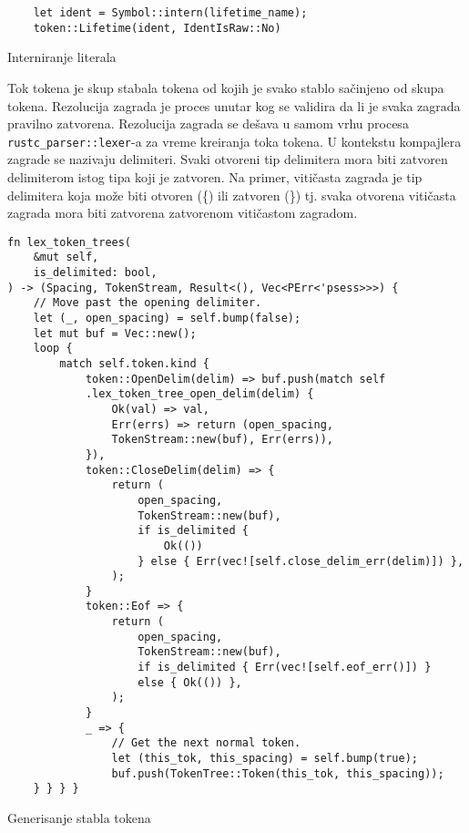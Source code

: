 \begin{listing}[H]
\begin{verbatim}
    let ident = Symbol::intern(lifetime_name);
    token::Lifetime(ident, IdentIsRaw::No)
\end{verbatim}
\caption{Interniranje literala}
\label{lst:intern}
\end{listing}
Tok tokena je skup stabala tokena od kojih je svako stablo sačinjeno od skupa tokena.  
Rezolucija zagrada je proces unutar kog se validira da li je svaka zagrada pravilno zatvorena.
Rezolucija zagrada se dešava u samom vrhu procesa \verb|rustc_parser::lexer|-a 
za vreme kreiranja toka tokena. U kontekstu kompajlera zagrade se nazivaju delimiteri. 
Svaki otvoreni tip delimitera mora biti zatvoren delimiterom istog tipa koji je zatvoren.
Na primer, vitičasta zagrada je tip delimitera koja može biti otvoren (\{) ili zatvoren (\}) tj.
svaka otvorena vitičasta zagrada mora biti zatvorena zatvorenom vitičastom zagradom.

\begin{listing}[H]
\begin{verbatim}
fn lex_token_trees(
    &mut self,
    is_delimited: bool,
) -> (Spacing, TokenStream, Result<(), Vec<PErr<'psess>>>) {
    // Move past the opening delimiter.
    let (_, open_spacing) = self.bump(false);
    let mut buf = Vec::new();
    loop {
        match self.token.kind {
            token::OpenDelim(delim) => buf.push(match self
            .lex_token_tree_open_delim(delim) {
                Ok(val) => val,
                Err(errs) => return (open_spacing, 
                TokenStream::new(buf), Err(errs)),
            }),
            token::CloseDelim(delim) => {
                return (
                    open_spacing,
                    TokenStream::new(buf),
                    if is_delimited { 
                        Ok(()) 
                    } else { Err(vec![self.close_delim_err(delim)]) },
                );
            }
            token::Eof => {
                return (
                    open_spacing,
                    TokenStream::new(buf),
                    if is_delimited { Err(vec![self.eof_err()]) } 
                    else { Ok(()) },
                );
            }
            _ => {
                // Get the next normal token.
                let (this_tok, this_spacing) = self.bump(true);
                buf.push(TokenTree::Token(this_tok, this_spacing));
    } } } }
\end{verbatim}
\caption{Generisanje stabla tokena}
\end{listing}


